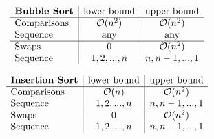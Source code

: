 \begin{sectionbox}
  
%

$$
  \begin{array}{l | c | c }
    \textbf{Bubble Sort} & \text{lower bound} & \text{upper bound}\\ \hline
    \text{Comparisons} & \mathcal{O}(n^2) & \mathcal{O}(n^2)\\
    \text{Sequence} & \text{any} & \text{any} \\ \hline
    \text{Swaps} & 0 & \mathcal{O}(n^2)\\
    \text{Sequence} & 1,2,...,n & n,n-1,...,1  \\
  \end{array}
$$


$$
  \begin{array}{l | c | c }
    \textbf{Insertion Sort} & \text{lower bound} & \text{upper bound}\\ \hline
    \text{Comparisons} & \mathcal{O}(n) & \mathcal{O}(n^2)\\
    \text{Sequence} & 1,2,...,n & n,n-1,...,1 \\ \hline
    \text{Swaps} & 0 & \mathcal{O}(n^2)\\
    \text{Sequence} & 1,2,...,n & n,n-1,...,1  \\
  \end{array}
$$
\end{sectionbox}
\vspace{-4pt}
